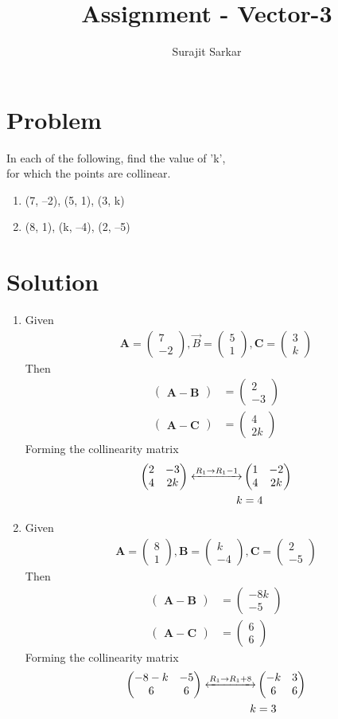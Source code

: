 \documentclass[journal,12pt,twocolumn]{IEEEtran}
\title{\mytitle}
\title{
Assignment - Vector-3
}
\author{Surajit Sarkar}
\newcommand{\myvec}[1]{\ensuremath{\begin{pmatrix}#1\end{pmatrix}}}
\let\vec\mathbf
\begin{document}
\maketitle
\tableofcontents
\bigskip
\section{\textbf{Problem}}
In each of the following, find the value of ’k’,\\ for which the points are collinear.
\begin{enumerate}[label=(\roman*)]
\item (7, –2), (5, 1), (3, k)
\item(8, 1), (k, –4), (2, –5)
\end{enumerate}
\section{\textbf{Solution}}
\begin{enumerate}[label=(\roman*)]
    \item Given
    \begin{align}
      \vec{A}=\myvec{7\\-2},\Vec{B}=\myvec{5\\1},\vec{C}=\myvec{3\\k}  
    \end{align}
    Then
    \begin{align}
        \myvec{\vec{A}-\vec{B}}&=\myvec{2\\-3}\\
        \myvec{\vec{A}-\vec{C}}&=\myvec{4\\2k}\
    \end{align}
    Forming the collinearity matrix
    \begin{align}
        \myvec{2&-3\\4&2k} \xleftrightarrow{R_1\rightarrow{R_1-1}}&\myvec{1&-2\\4&2k}\\
        k&=4
        \end{align}
    
    \item Given
     \begin{align}
      \vec{A}=\myvec{8\\1},\vec{B}=\myvec{k\\-4},\vec{C}=\myvec{2\\-5}  
    \end{align}
    Then
    \begin{align}
        \myvec{\vec{A}-\vec{B}}&=\myvec{-8k\\-5}\\
        \myvec{\vec{A}-\vec{C}}&=\myvec{6\\6}\
    \end{align}
    Forming the collinearity matrix
    \begin{align}
        \myvec{-8-k&-5\\6&6} \xleftrightarrow{R_1\rightarrow{R_1+8}}&\myvec{-k&3\\6&6}\\
        k&=3
        \end{align}
\end{enumerate}
\end{document}
